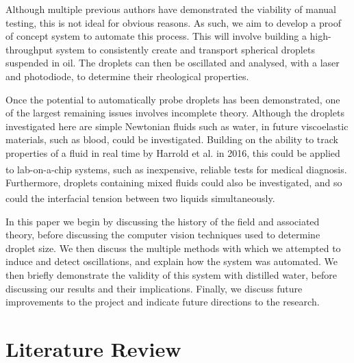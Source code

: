\documentclass{physics_article_B}
\begin{document}
Although multiple previous authors have demonstrated the viability of manual testing, this is not ideal for obvious reasons. As such, we aim to develop a proof of concept system to automate this process. This will involve building a high-throughput system to consistently create and transport spherical droplets suspended in oil. The droplets can then be oscillated and analysed, with a laser and photodiode, to determine their rheological properties.

Once the potential to automatically probe droplets has been demonstrated, one of the largest remaining issues involves incomplete theory. Although the droplets investigated here are simple Newtonian fluids such as water, in future viscoelastic materials, such as blood, could be investigated. Building on the ability to track properties of a fluid in real time by Harrold et al. in 2016\cite{harrold}, this could be applied to lab-on-a-chip systems, such as inexpensive, reliable tests\textsuperscript{\cite{yager}} for medical diagnosis. Furthermore, droplets containing mixed fluids could also be investigated, and so could the interfacial tension between two liquids\textsuperscript{\cite{Backholm2017}} simultaneously.

In this paper we begin by discussing the history of the field and associated theory, before discussing the computer vision techniques used to determine droplet size. We then discuss the multiple methods with which we attempted to induce and detect oscillations, and explain how the system was automated. We then briefly demonstrate the validity of this system with distilled water, before discussing our results and their implications. Finally, we discuss future improvements to the project and indicate future directions to the research.


\section{Literature Review\label{sect:lit}}
\end{document}
